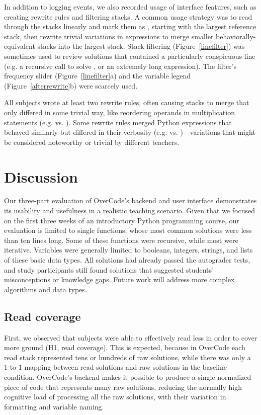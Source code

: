 In addition to logging  events, we also recorded usage of interface features, such as creating rewrite rules and filtering stacks. A common usage strategy was to read through the stacks linearly and mark them as , starting with the largest reference stack, then rewrite trivial variations in expressions to merge smaller behaviorally-equivalent stacks into the largest stack. Stack filtering (Figure~\ref{linefilter}) was sometimes used to review solutions that contained a particularly conspicuous line (e.g. a recursive call to solve , or an extremely long expression). The filter's frequency slider (Figure~\ref{linefilter}a) and the variable legend (Figure~\ref{afterrewrite}b) were scarcely used.

All subjects wrote at least two rewrite rules, often causing stacks to merge that only differed in some trivial way, like reordering operands in multiplication statements (e.g.  vs. ). Some rewrite rules merged Python expressions that behaved similarly but differed in their verbosity (e.g.  vs. ) - variations that might be considered noteworthy or trivial by different teachers.
\section{Discussion}

Our three-part evaluation of OverCode's backend and user interface demonstrates its usability and usefulness in a realistic teaching scenario. Given that we focused on the first three weeks of an introductory Python programming course, our evaluation is limited to single functions, whose most common solutions were less than ten lines long. Some of these functions were recursive, while most were iterative. Variables were generally limited to booleans, integers, strings, and lists of these basic data types. All solutions had already passed the autograder tests, and study participants still found solutions that suggested students' misconceptions or knowledge gaps. Future work will address more complex algorithms and data types.

\subsection{Read coverage}
First, we observed that subjects were able to effectively read less in order to cover more ground (H1, read coverage). This is expected, because in OverCode each read stack represented tens or hundreds of raw solutions, while there was only a 1-to-1 mapping between read solutions and raw solutions in the baseline condition. OverCode's backend makes it possible to produce a single normalized piece of code that represents many raw solutions, reducing the normally high cognitive load of processing all the raw solutions, with their variation in formatting and variable naming.

